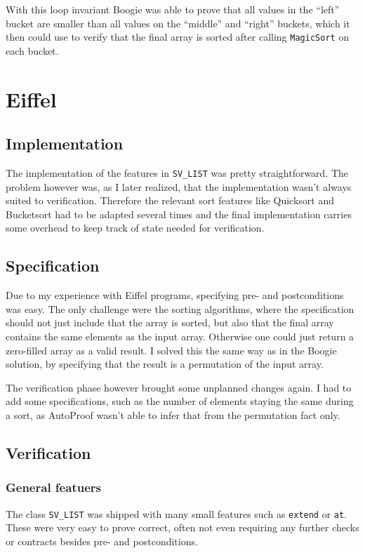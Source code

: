 \documentclass[a4paper,10pt]{article}
\begin{document}
With this loop invariant Boogie was able to prove that all values in the ``left'' bucket are smaller than all values on the ``middle'' and ``right'' buckets, 
which it then could use to verify that the final array is sorted after calling \lstinline!MagicSort! on each bucket.
\section{Eiffel}

\subsection{Implementation}

The implementation of the features in \lstinline!SV_LIST! was pretty straightforward.
The problem however was, as I later realized, that the implementation wasn't always suited to verification.
Therefore the relevant sort features like Quicksort and Bucketsort had to be adapted several times 
and the final implementation carries some overhead to keep track of state needed for verification.

\subsection{Specification}

Due to my experience with Eiffel programs, specifying pre- and postconditions was easy.
The only challenge were the sorting algorithms, where the specification should not just include that the array is sorted,
but also that the final array contains the same elements as the input array.
Otherwise one could just return a zero-filled array as a valid result.
I solved this the same way as in the Boogie solution, by specifying that the result is a permutation of the input array.

The verification phase however brought some unplanned changes again.
I had to add some specifications, such as the number of elements staying the same during a sort, 
as AutoProof wasn't able to infer that from the permutation fact only.

\subsection{Verification}

\subsubsection{General featuers}
The class \lstinline!SV_LIST! was shipped with many small features such as \lstinline!extend! or \lstinline!at!.
These were very easy to prove correct, often not even requiring any further checks or contracts besides pre- and postconditions.
\end{document}
